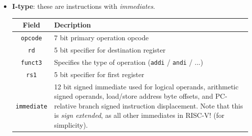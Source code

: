 \documentclass[a4paper,11pt]{article}
\begin{document}
\begin{itemize}
	\item \textbf{I-type}: these are instructions with \textit{immediates}.
	      \begin{table}[H]
		      \center
		      \begin{tabular} { c | p{12cm} }
			      \bfseries Field    & \bfseries Decription                                                                                                                                                                                                                                                   \\
			      \hline
			      \texttt{opcode}    & 7 bit primary operation opcode                                                                                                                                                                                                                                         \\
			      \texttt{rd}        & 5 bit specifier for destination register                                                                                                                                                                                                                               \\
			      \texttt{funct3}    & Specifies the type of operation (\lstinline|addi| / \lstinline|andi| / ...)                                                                                                                                                                                            \\
			      \texttt{rs1}       & 5 bit specifier for first register                                                                                                                                                                                                                                     \\
			      \texttt{immediate} & 12 bit signed immediate used for logical operands, arithmetic signed operands, load/store address byte offsets, and PC-relative branch signed instruction displacement. Note that this is \textit{sign extended}, as all other immediates in RISC-V! (for simplicity). \\
		      \end{tabular}
	      \end{table}


\end{itemize}
\end{document}
